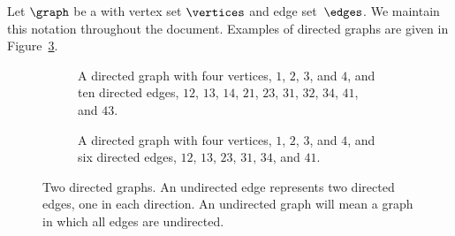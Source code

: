 Let \(\graph\) be a  with vertex set \(\vertices\) and edge set~\(\edges\).
We maintain this notation throughout the document.
Examples of directed graphs are given in Figure~\ref{fig:directedgraphs}.

\begin{figure}[htbp]
    \centering
    \begin{subfigure}[b]{0.47\textwidth}
        \centering
        \caption{A directed graph with four vertices, \(1\), \(2\), \(3\), and \(4\), and ten directed edges, \(12\), \(13\), \(14\), \(21\), \(23\), \(31\), \(32\), \(34\), \(41\), and \(43\).}
        \label{fig:directedgraphs:1}
    \end{subfigure}
    \hfill
    \begin{subfigure}[b]{0.47\textwidth}
        \centering
        \caption{A directed graph with four vertices, \(1\), \(2\), \(3\), and \(4\), and six directed edges, \(12\), \(13\), \(23\), \(31\), \(34\), and \(41\).}
        \label{fig:directedgraphs:2}
    \end{subfigure}
    \caption{Two directed graphs.  An undirected edge represents two directed edges, one in each direction. An undirected graph will mean a graph in which all edges are undirected.}
    \label{fig:directedgraphs}
\end{figure}


